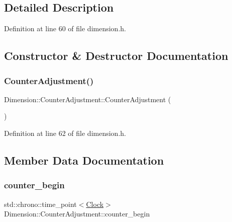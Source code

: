 \subsection{Detailed Description}


Definition at line 60 of file dimension.\+h.



\subsection{Constructor \& Destructor Documentation}
\mbox{\label{struct_dimension_1_1_counter_adjustment_acc176dbec1decf3ae2276f191c78d9c0}} 
\subsubsection{\texorpdfstring{Counter\+Adjustment()}{CounterAdjustment()}}
{\footnotesize\ttfamily Dimension\+::\+Counter\+Adjustment\+::\+Counter\+Adjustment (\begin{DoxyParamCaption}{ }\end{DoxyParamCaption})\hspace{0.3cm}{\ttfamily [inline]}}



Definition at line 62 of file dimension.\+h.



\subsection{Member Data Documentation}
\mbox{\label{struct_dimension_1_1_counter_adjustment_a479e5fe39e4f030d8c8ed49efaf3c9c5}} 
\subsubsection{\texorpdfstring{counter\+\_\+begin}{counter\_begin}}
{\footnotesize\ttfamily std\+::chrono\+::time\+\_\+point$<$\hyperlink{universe_8h_a0ef8d951d1ca5ab3cfaf7ab4c7a6fd80}{Clock}$>$ Dimension\+::\+Counter\+Adjustment\+::counter\+\_\+begin}




